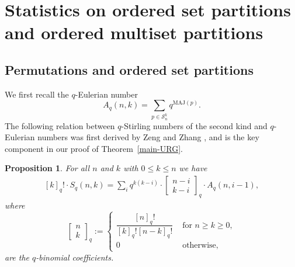 \documentclass[12pt]{amsart}
\numberwithin{equation}{section}
\theoremstyle{plain}
\newtheorem{proposition}[theorem]{Proposition}
\theoremstyle{definition}
\def\MAJ{\mathrm{MAJ}}
\def\SS{\mathcal{S}}
\newcommand\qbin[3]{\left[\begin{matrix} #1 \\ #2 \end{matrix} \right]_{#3}}
\begin{document}
\section{Statistics on ordered set partitions and ordered multiset partitions}\label{sec:stat on OP}
\subsection{Permutations and ordered set partitions}\label{subsec:OP}
We first recall the $q$-Eulerian number
$$
A_q(n,k)=\sum_{p\in\SS_n^k}q^{\MAJ(p)}.
$$
The following relation between $q$-Stirling numbers of the second kind and $q$-Eulerian numbers was first derived by Zeng and Zhang \cite{ZZ}, and is the key component in our proof of Theorem~\ref{main-URG}.
\begin{proposition}
For all $n$ and $k$ with $0\le k \le n$ we have
\begin{align}\label{id:Zeng-Zhang}
[k]_q!\cdot S_q(n,k)=\sum_i q^{k(k-i)}\cdot \qbin{n-i}{k-i}{q}\cdot A_q(n,i-1),
\end{align}
where $$\qbin{n}{k}{q} := \begin{cases}\dfrac{[n]_q!}{[k]_q![n-k]_q!} & \text{ for } n\geq k\geq 0,\\[15pt] 0 & \text{ otherwise, }\end{cases}$$ are the $q$-binomial coefficients.
\end{proposition}
\end{document}
